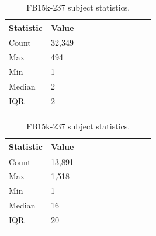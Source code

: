 \begin{table}[H]
	\parbox{.5\linewidth}{
		\centering
		\begin{tabular}{lllllllllll}
  			\textbf{Statistic} & \textbf{Value}  \\
  			\hline
			Count & 32,349 \\
			Max & 494 \\
			Min & 1 \\
  			Median & 2 \\
  			IQR & 2 \\
			&
		\end{tabular}
		\caption{WN18RR subject statistics.}
		}
	\hfill
	\parbox{.5\linewidth}{
		\centering
		\begin{tabular}{lllllllllll}
  			\textbf{Statistic} & \textbf{Value}  \\
  			\hline
			Count &13,891 \\
			Max & 1,518 \\
			Min & 1 \\
  			Median & 16 \\
  			IQR & 20 \\
			&
		\end{tabular}
		\caption{FB15k-237 subject statistics.}
		}
\end{table}



